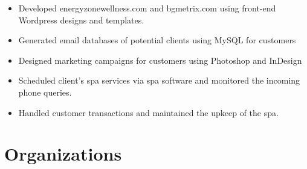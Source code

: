 \documentclass[12pt,letterpaper,sans]{moderncv}        %
\begin{document}
{\begin{itemize}%
\item Developed energyzonewellness.com and bgmetrix.com using front-end Wordpress designs and templates.
\item Generated email databases of potential clients using MySQL for customers
\item Designed marketing campaigns for customers using Photoshop and InDesign
\end{itemize} 
  }  
{\begin{itemize}%
\item Scheduled client’s spa services via spa software and monitored the incoming phone queries. 
\item Handled customer transactions and maintained the upkeep of the spa.
\end{itemize} }

\section{Organizations}


\nocite{*}



\end{document}

